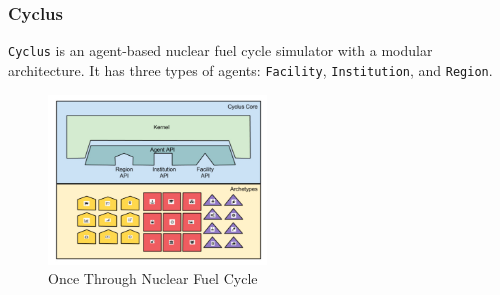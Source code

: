 \begin{frame}
    \frametitle{Cyclus}
        \texttt{Cyclus} is an agent-based nuclear fuel cycle simulator with a modular architecture.
        It has three types of agents: \texttt{Facility}, \texttt{Institution}, and \texttt{Region}.
     \\   
    \begin{figure}[htbp!]
      \begin{center}
        \includegraphics[height=4.5cm]{../paper/figures/nfc}
      \end{center}
            \caption{Once Through Nuclear Fuel Cycle \cite{huff_fundamental_2016}}
      \label{fig:cyclus-modular}
    \end{figure}
  \end{frame}
  